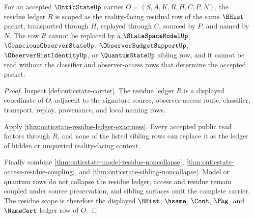\begin{theorem}
\label{thm:onticstate-residue-ledger-scope}
For an accepted $\OnticStateUp$ carrier $O=(S,A,K,R,H,C,P,N)$, the residue ledger $R$ is scoped as the reality-facing residual row of the same $\BHist$ packet, transported through $H$, replayed through $C$, sourced by $P$, and named by $N$. The row $R$ cannot be replaced by a $\StateSpaceModelUp$, $\ConsciousObserverStateUp$, $\ObserverBudgetSupportUp$, $\ObserverHistIdentityUp$, or $\QuantumStateUp$ sibling row, and it cannot be read without the classifier and observer-access rows that determine the accepted packet.
\end{theorem}
\begin{proof}
Inspect \autoref{def:onticstate-carrier}. The residue ledger $R$ is a displayed coordinate of $O$, adjacent to the signature source, observer-access route, classifier, transport, replay, provenance, and local naming rows.

Apply \autoref{thm:onticstate-residue-ledger-exactness}. Every accepted public read factors through $R$, and none of the listed sibling rows can replace it as the ledger of hidden or unqueried reality-facing content.

Finally combine \autoref{thm:onticstate-model-residue-noncollapse}, \autoref{thm:onticstate-access-residue-coupling}, and \autoref{thm:onticstate-sibling-noncollapse}. Model or quantum rows do not collapse the residue ledger, access and residue remain coupled under source preservation, and sibling surfaces omit the complete carrier. The residue scope is therefore the displayed $\BHist$, $\hsame$, $\Cont$, $\Pkg$, and $\NameCert$ ledger row of $O$.
\end{proof}


